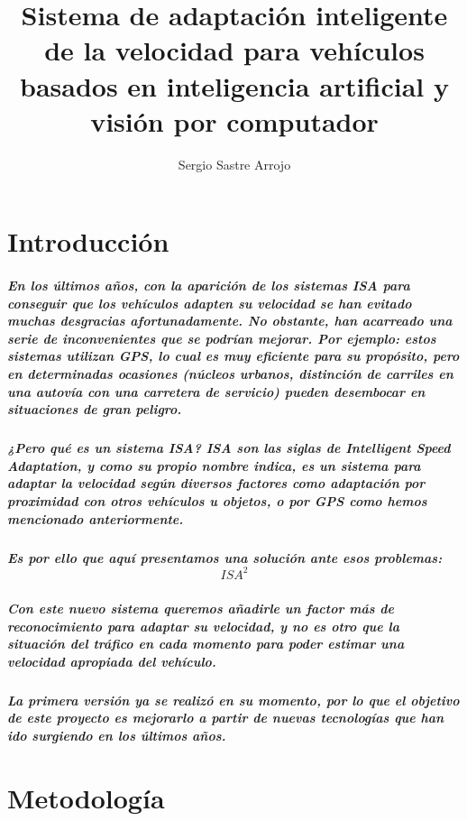 \documentclass[12pt,a4paper]{report}
\begin{document}
\title{Sistema de adaptación inteligente de la velocidad para vehículos basados en inteligencia artificial y visión por computador}
\author{Sergio Sastre Arrojo}
\maketitle
\chapter*{Introducción}
\paragraph*{En los últimos años, con la aparición de los sistemas ISA para conseguir que los vehículos adapten su velocidad se han evitado muchas desgracias afortunadamente. No obstante, han acarreado una serie de inconvenientes que se podrían mejorar. Por ejemplo: estos sistemas utilizan GPS, lo cual es muy eficiente para su propósito, pero en determinadas ocasiones (núcleos urbanos, distinción de carriles en una autovía con una carretera de servicio) pueden desembocar en situaciones de gran peligro.}
\paragraph*{¿Pero qué es un sistema ISA? ISA son las siglas de Intelligent Speed Adaptation, y como su propio nombre indica, es un sistema para adaptar la velocidad según diversos factores como adaptación por proximidad con otros vehículos u objetos, o por GPS como hemos mencionado anteriormente.}
\paragraph*{Es por ello que aquí presentamos una solución ante esos problemas: \[ISA^{2}\]}
\paragraph*{Con este nuevo sistema queremos añadirle un factor más de reconocimiento para adaptar su velocidad, y no es otro que la situación del tráfico en cada momento para poder estimar una velocidad apropiada del vehículo.}
\paragraph*{La primera versión ya se realizó en su momento, por lo que el objetivo de este proyecto es mejorarlo a partir de nuevas tecnologías que han ido surgiendo en los últimos años.}
\chapter*{Metodología}
\end{document}
